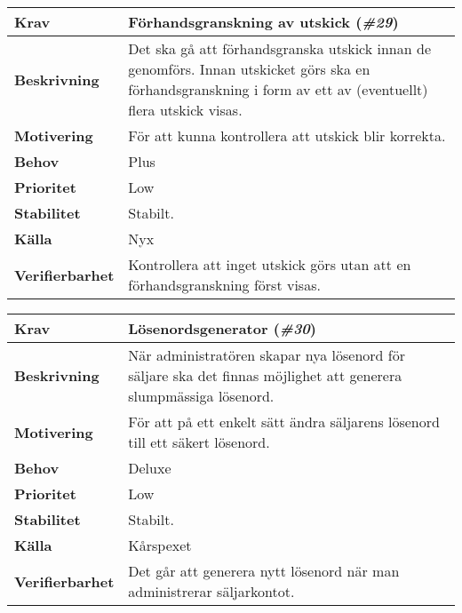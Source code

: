 \documentclass[a4paper, twoside, 11pt, titlepage]{article}
\begin{document}
	\begin{tabular} { p{2.6cm} p{12.5cm} }
		\hline
		\sffamily\textbf{Krav} & Förhandsgranskning av utskick (\emph{\#29})  \\
		\hline
		\sffamily\textbf{Beskrivning} & Det ska gå att förhandsgranska utskick innan de genomförs. Innan utskicket görs ska en förhandsgranskning i form av ett av (eventuellt) flera utskick visas.  \\
		\hline
		\sffamily\textbf{Motivering} & För att kunna kontrollera att utskick blir korrekta.  \\
		\hline
		\sffamily\textbf{Behov} & Plus  \\
		\hline
		\sffamily\textbf{Prioritet} & Low  \\
		\hline
		\sffamily\textbf{Stabilitet} & Stabilt.  \\
		\hline
		\sffamily\textbf{Källa} & Nyx  \\
		\hline
		\sffamily\textbf{Verifierbarhet} & Kontrollera att inget utskick görs utan att en förhandsgranskning först visas.  \\
		\hline
	\end{tabular}
	\vspace{6mm}

	\begin{tabular} { p{2.6cm} p{12.5cm} }
		\hline
		\sffamily\textbf{Krav} & Lösenordsgenerator (\emph{\#30})  \\
		\hline
		\sffamily\textbf{Beskrivning} & När administratören skapar nya lösenord för säljare ska det finnas möjlighet att generera slumpmässiga lösenord.  \\
		\hline
		\sffamily\textbf{Motivering} & För att på ett enkelt sätt ändra säljarens lösenord till ett säkert lösenord.  \\
		\hline
		\sffamily\textbf{Behov} & Deluxe  \\
		\hline
		\sffamily\textbf{Prioritet} & Low  \\
		\hline
		\sffamily\textbf{Stabilitet} & Stabilt.  \\
		\hline
		\sffamily\textbf{Källa} & Kårspexet  \\
		\hline
		\sffamily\textbf{Verifierbarhet} & Det går att generera nytt lösenord när man administrerar säljarkontot.  \\
		\hline
	\end{tabular}
	\vspace{6mm}
\end{document}
